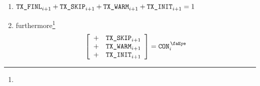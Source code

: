 \begin{enumerate}
                \begin{enumerate}
                        \item $\texttt{TX}\texttt{\_FINL} _{i + 1} + \texttt{TX}\texttt{\_SKIP} _{i + 1} + \texttt{TX}\texttt{\_WARM} _{i + 1} + \texttt{TX}\texttt{\_INIT} _{i + 1} = 1$
                        \item furthermore\footnote{}
                                \[
                                        \left[ \begin{array}{lcl}
                                                + & \txSkip _{i + 1} \\
                                                + & \txWarm _{i + 1} \\
                                                + & \txInit _{i + 1} \\
                                        \end{array} \right]
                                        = \peekContext _{i}
                                \]
                \end{enumerate}
\end{enumerate}

